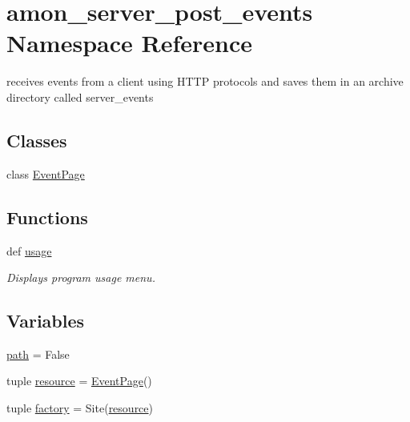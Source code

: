 \hypertarget{namespaceamon__server__post__events}{\section{amon\-\_\-server\-\_\-post\-\_\-events Namespace Reference}
\label{namespaceamon__server__post__events}
}


receives events from a client using H\-T\-T\-P protocols and saves them in an archive directory called server\-\_\-events  


\subsection*{Classes}
\begin{DoxyCompactItemize}
\item 
class \hyperlink{classamon__server__post__events_1_1_event_page}{Event\-Page}
\end{DoxyCompactItemize}
\subsection*{Functions}
\begin{DoxyCompactItemize}
\item 
def \hyperlink{namespaceamon__server__post__events_a7619904ce5871cb3eb8a59d1e6c51874}{usage}
\begin{DoxyCompactList}\small\item\em Displays program usage menu. \end{DoxyCompactList}\end{DoxyCompactItemize}
\subsection*{Variables}
\begin{DoxyCompactItemize}
\item 
\hyperlink{namespaceamon__server__post__events_a3394c937469c08d57c45dc954e46d2d1}{path} = False
\item 
tuple \hyperlink{namespaceamon__server__post__events_a1291557fb5d0cbcce136ead0b455db44}{resource} = \hyperlink{classamon__server__post__events_1_1_event_page}{Event\-Page}()
\item 
tuple \hyperlink{namespaceamon__server__post__events_ac7a6c7d8defce5e05347f5553d490df1}{factory} = Site(\hyperlink{namespaceamon__server__post__events_a1291557fb5d0cbcce136ead0b455db44}{resource})
\end{DoxyCompactItemize}


